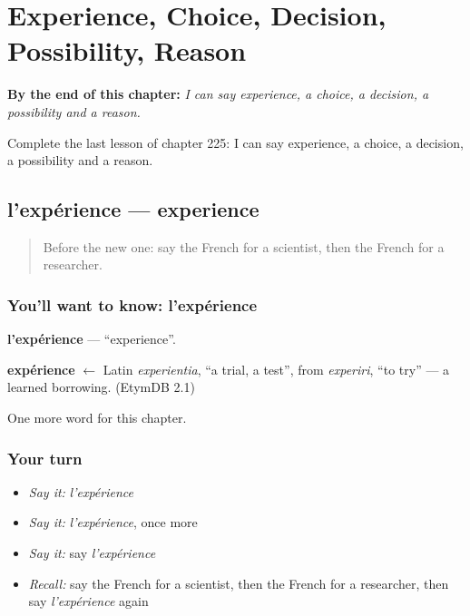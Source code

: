 
\chapter{Experience, Choice, Decision, Possibility, Reason}
\label{ch:fr-experience-choice-decision-possibility-reason}

\begin{chapteropening}
\textbf{By the end of this chapter:} \emph{I can say experience, a choice, a decision, a possibility and a reason.}

Complete the last lesson of chapter 225: I can say experience, a choice, a decision, a possibility and a reason.
\end{chapteropening}

\section[l'expérience]{l'expérience — experience}

\label{lesson:FR-C225-experience}



\begin{quote}
Before the new one: say the French for a scientist, then the French for a researcher.
\end{quote}

\subsection*{You'll want to know: l'expérience}
\textbf{l'expérience} — \textquotedblleft{}experience\textquotedblright{}.

\begin{cousinweb}
\textbf{expérience} $\leftarrow$ Latin \emph{experientia}, \textquotedblleft{}a trial, a test\textquotedblright{}, from \emph{experiri}, \textquotedblleft{}to try\textquotedblright{} — a learned borrowing. (EtymDB 2.1)
\end{cousinweb}

\begin{grammarlens}[title={What you've built}]
One more word for this chapter.
\end{grammarlens}

\subsection*{Your turn}
\begin{itemize}
\raggedright
  \item \emph{Say it:} \emph{l'expérience}
  \item \emph{Say it:} \emph{l'expérience}, once more
  \item \emph{Say it:} say \emph{l'expérience}
  \item \emph{Recall:} say the French for a scientist, then the French for a researcher, then say \emph{l'expérience} again
\end{itemize}

